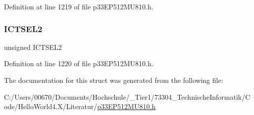 Definition at line 1219 of file p33\+E\+P512\+M\+U810.\+h.

\mbox{\label{structtag_i_c13_c_o_n1_b_i_t_s_a47d80892d449e6edbd5ba2ba9ff06deb}} 
\subsubsection{\texorpdfstring{I\+C\+T\+S\+E\+L2}{ICTSEL2}}
{\footnotesize\ttfamily unsigned I\+C\+T\+S\+E\+L2}



Definition at line 1220 of file p33\+E\+P512\+M\+U810.\+h.



The documentation for this struct was generated from the following file\+:\begin{DoxyCompactItemize}
\item 
C\+:/\+Users/00670/\+Documents/\+Hochschule/\+\_\+\+Tier1/73304\+\_\+\+Technische\+Informatik/\+Code/\+Hello\+World4.\+X/\+Literatur/\hyperlink{p33_e_p512_m_u810_8h}{p33\+E\+P512\+M\+U810.\+h}\end{DoxyCompactItemize}
